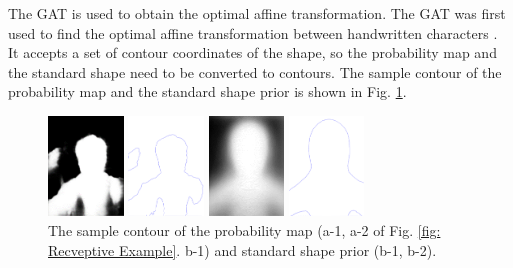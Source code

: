The GAT is used to obtain the optimal affine transformation. The GAT was first used to find the optimal affine transformation between handwritten characters \cite{GAT:wakahara1998adaptive} \cite{GAT:xiaona2007hierarchical}. It accepts a set of contour coordinates of the shape, so the probability map and the standard shape need to be converted to contours. The sample contour of the probability map and the standard shape prior is shown in Fig. \ref{fig: The sample contour of the probability map and standard shape prior}.
\begin{figure}[h]
    \centering
    \begin{minipage}[b]{2cm}
        \centering
        \includegraphics[width=2cm]{figs/GAT_Contour_1_1.png}
        \caption*{a-1}
    \end{minipage}
    \mbox{\hspace{1cm}}
    \begin{minipage}[b]{2cm}
        \centering
        \includegraphics[width=2cm]{figs/GAT_Contour_1_2.png}
        \caption*{a-2}
    \end{minipage}

    \begin{minipage}[b]{2cm}
        \centering
        \includegraphics[width=2cm]{figs/GAT_Contour_2_1.png}
        \caption*{b-1}
    \end{minipage}
    \mbox{\hspace{1cm}}
    \begin{minipage}[b]{2cm}
        \centering
        \includegraphics[width=2cm]{figs/GAT_Contour_2_2.png}
        \caption*{b-2}
    \end{minipage}
    \caption{The sample contour of the probability map (a-1, a-2 of Fig. \ref{fig: Recveptive Example}. b-1) and standard shape prior (b-1, b-2).}
    \label{fig: The sample contour of the probability map and standard shape prior}
\end{figure}
